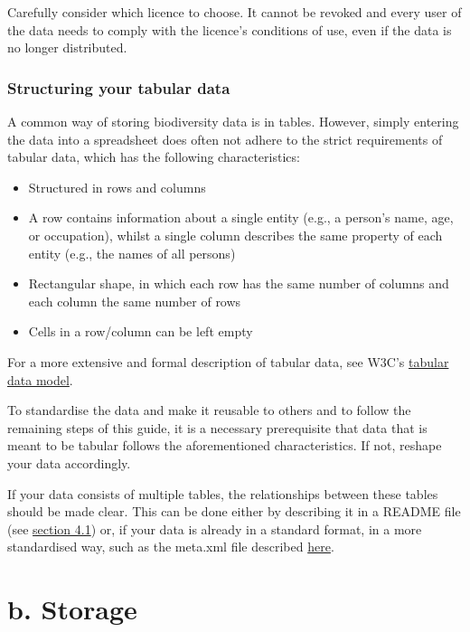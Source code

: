 \documentclass[
]{book}
\begin{document}
Carefully consider which licence to choose. It cannot be revoked and every user of the data needs to comply with the licence's conditions of use, even if the data is no longer distributed.

\hypertarget{structuring-your-tabular-data}{%
\section{Structuring your tabular data}\label{structuring-your-tabular-data}}

A common way of storing biodiversity data is in tables. However, simply entering the data into a spreadsheet does often not adhere to the strict requirements of tabular data, which has the following characteristics:

\begin{itemize}
\item
  Structured in rows and columns
\item
  A row contains information about a single entity (e.g., a person's name, age, or occupation), whilst a single column describes the same property of each entity (e.g., the names of all persons)
\item
  Rectangular shape, in which each row has the same number of columns and each column the same number of rows
\item
  Cells in a row/column can be left empty
\end{itemize}

For a more extensive and formal description of tabular data, see W3C's \href{https://www.w3.org/TR/tabular-data-model/}{tabular data model}.

To standardise the data and make it reusable to others and to follow the remaining steps of this guide, it is a necessary prerequisite that data that is meant to be tabular follows the aforementioned characteristics. If not, reshape your data accordingly.

If your data consists of multiple tables, the relationships between these tables should be made clear. This can be done either by describing it in a README file (see \protect\hyperlink{describe-data}{section 4.1}) or, if your data is already in a standard format, in a more standardised way, such as the meta.xml file described \protect\hyperlink{structural-metadata}{here}.

\hypertarget{part-b.-storage}{%
\part*{b. Storage}\label{part-b.-storage}}
\end{document}
